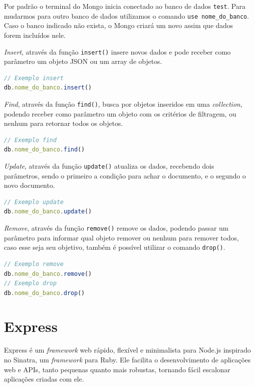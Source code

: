 \documentclass[
	12pt,				%
	openright,			%
	twoside,			%
	a4paper,			%
	english,			%
	brazil				%
	]{abntex2}
\begin{document}
Por padrão o terminal do Mongo inicia conectado ao banco de dados \verb|test|. Para mudarmos para outro banco de dados utilizamos o comando \verb|use nome_do_banco|. Caso o banco indicado não exista, o Mongo criará um novo assim que dados forem incluídos nele.

\textit{Insert}, através da função \verb|insert()| insere novos dados e pode receber como parâmetro um objeto JSON ou um array de objetos.

\begin{lstlisting}[language=javascript]
// Exemplo insert
db.nome_do_banco.insert()
\end{lstlisting}

\textit{Find}, através da função \verb|find()|, busca por objetos inseridos em uma \textit{collection}, podendo receber como parâmetro um objeto com os critérios de filtragem, ou nenhum para retornar todos os objetos.
 
\begin{lstlisting}[language=javascript]
// Exemplo find
db.nome_do_banco.find()
\end{lstlisting}

\textit{Update}, através da função \verb|update()| atualiza os dados, recebendo dois parâmetros, sendo o primeiro a condição para achar o documento, e o segundo o novo documento.

\begin{lstlisting}[language=javascript]
// Exemplo update
db.nome_do_banco.update()
\end{lstlisting}

\textit{Remove}, através da função \verb|remove()| remove os dados, podendo passar um parâmetro para informar qual objeto remover ou nenhum para remover todos, caso esse seja seu objetivo, também é possível utilizar o comando \verb|drop()|.

\begin{lstlisting}[language=javascript]
// Exemplo remove
db.nome_do_banco.remove()
// Exemplo drop
db.nome_do_banco.drop()
\end{lstlisting}


\section{Express}

Express é um \textit{framework} web rápido, flexível e minimalista para Node.js inspirado no Sinatra, um \textit{framework} para Ruby. Ele facilita o desenvolvimento de aplicações web e APIs, tanto pequenas quanto mais robustas, tornando fácil escalonar aplicações criadas com ele.
\end{document}
